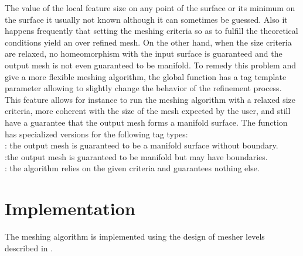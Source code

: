 The value of the local feature size on any point of the surface
or its minimum on the surface it usually not known
although it can sometimes be guessed. Also it happens frequently
that setting the meshing criteria so as to fulfill the theoretical
conditions yield an over refined mesh.
On the other hand, when the size criteria are relaxed,
no homeomorphism with the input surface is guaranteed
and the output mesh is not even guaranteed to be manifold.
To remedy this problem and give a more flexible
meshing algorithm, the global function 
 has a tag template parameter
allowing to slightly change the behavior of the refinement process.
This feature allows for instance to run the meshing
algorithm with a relaxed size criteria, more coherent
with the size of the mesh expected by the user,
and still have a guarantee that
the output mesh forms a manifold surface.
The function  has specialized versions
for the following  tag types: \\
: the output mesh is guaranteed to be a manifold
surface without boundary.\\
:the output mesh is guaranteed to be
manifold but may have boundaries.\\
: the algorithm relies on the given criteria and
guarantees nothing else.

\section{Implementation}

The meshing algorithm is implemented using the design of mesher levels
described in \cite{Rineau-and-co}. 




